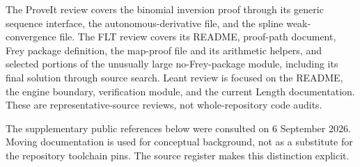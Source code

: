 \documentclass[11pt,letterpaper]{article}
\theoremstyle{definition}\newtheorem{definition}[theorem]{Definition}
\newcommand{\code}[1]{\texttt{\detokenize{#1}}}
\begin{document}
The ProveIt review covers the binomial inversion proof through its generic sequence interface, the autonomous-derivative file, and the spline weak-convergence file. The FLT review covers its README, proof-path document, Frey package definition, the map-proof file and its arithmetic helpers, and selected portions of the unusually large no-Frey-package module, including its final solution through source search. Leant review is focused on the README, the engine boundary, verification module, and the current Length documentation. These are representative-source reviews, not whole-repository code audits.

The supplementary public references below were consulted on 6 September 2026. Moving \code{latest} documentation is used for conceptual background, not as a substitute for the repository toolchain pins. The source register makes this distinction explicit.
\end{document}

